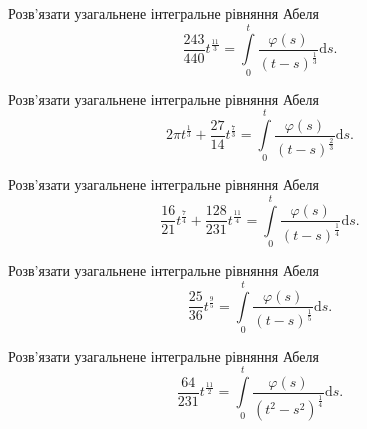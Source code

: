 \documentclass[12pt]{extarticle}
\begin{document}
\begin{Exercise}
Розв’язати узагальнене інтегральне рівняння Абеля \[\dfrac{243}{440} t^{\frac{11}{3}} = \int\limits_{0}^{t} \dfrac{\varphi(s)}{(t-s)^{\frac{1}{3}}} \mathrm{d}s.\]
\end{Exercise}

\begin{Exercise}
Розв’язати узагальнене інтегральне рівняння Абеля \[2\pi t^{\frac{1}{3}} + \dfrac{27}{14} t^{\frac{7}{3}} = \int\limits_{0}^{t} \dfrac{\varphi(s)}{(t-s)^{\frac{2}{3}}} \mathrm{d}s.\]
\end{Exercise}

\begin{Exercise}
Розв’язати узагальнене інтегральне рівняння Абеля \[\dfrac{16}{21} t^{\frac{7}{4}} + \dfrac{128}{231} t^{\frac{11}{4}} = \int\limits_{0}^{t} \dfrac{\varphi(s)}{(t-s)^{\frac{1}{4}}} \mathrm{d}s.\]
\end{Exercise}

\begin{Exercise}
Розв’язати узагальнене інтегральне рівняння Абеля \[\dfrac{25}{36} t^{\frac{9}{5}} = \int\limits_{0}^{t} \dfrac{\varphi(s)}{(t-s)^{\frac{1}{5}}} \mathrm{d}s.\]
\end{Exercise}

\begin{Exercise}
Розв’язати узагальнене інтегральне рівняння Абеля \[\dfrac{64}{231} t^{\frac{11}{2}} = \int\limits_{0}^{t} \dfrac{\varphi(s)}{(t^2-s^2)^{\frac{1}{4}}} \mathrm{d}s.\]
\end{Exercise}
\end{document}
